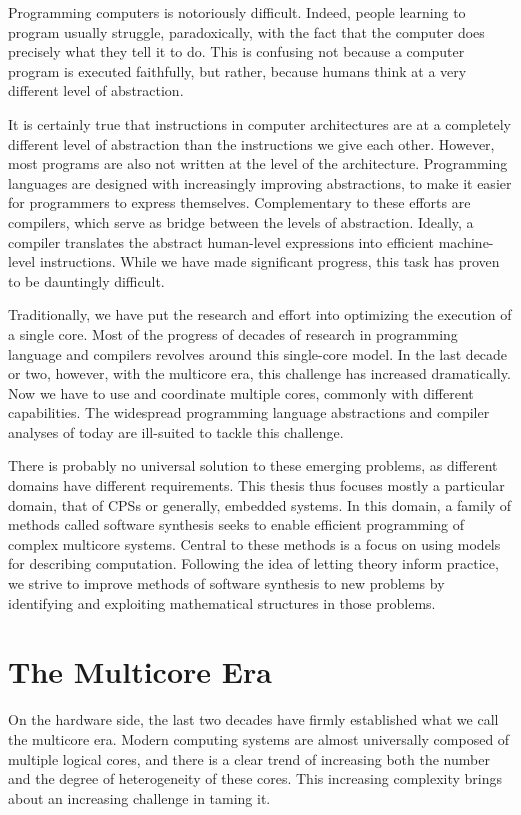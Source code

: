 Programming computers is notoriously difficult.
Indeed, people learning to program usually struggle, paradoxically, with the fact that the computer does precisely what they tell it to do. 
This is confusing not because a computer program is executed faithfully, but rather, because humans think at a very different level of abstraction.

It is certainly true that instructions in computer architectures are at a completely different level of abstraction than the instructions we give each other.
However, most programs are also not written at the level of the architecture.
Programming languages are designed with increasingly improving abstractions, to make it easier for programmers to express themselves.
Complementary to these efforts are compilers, which serve as bridge between the levels of abstraction.
Ideally, a compiler translates the abstract human-level expressions into efficient machine-level instructions.
While we have made significant progress, this task has proven to be dauntingly difficult.

Traditionally, we have put the research and effort into optimizing the execution of a single core.
Most of the progress of decades of research in programming language and compilers revolves around this single-core model.
In the last decade or two, however, with the multicore era, this challenge has increased dramatically.
Now we have to use and coordinate multiple cores, commonly with different capabilities.
The widespread programming language abstractions and compiler analyses of today are ill-suited to tackle this challenge.

There is probably no universal solution to these emerging problems, as different domains have different requirements.
This thesis thus focuses mostly a particular domain, that of \acfp{CPS} or generally, embedded systems.
In this domain, a family of methods called software synthesis seeks to enable efficient programming of complex multicore systems.
Central to these methods is a focus on using models for describing computation.
Following the idea of letting theory inform practice, we strive to improve methods of software synthesis to new problems by identifying and exploiting mathematical structures in those problems.

\section{The Multicore Era}

On the hardware side, the last two decades have firmly established what we call the multicore era.
Modern computing systems are almost universally composed of multiple logical cores, and there is a clear trend of increasing both the number and the degree of heterogeneity of these cores.
This increasing complexity brings about an increasing challenge in taming it.

